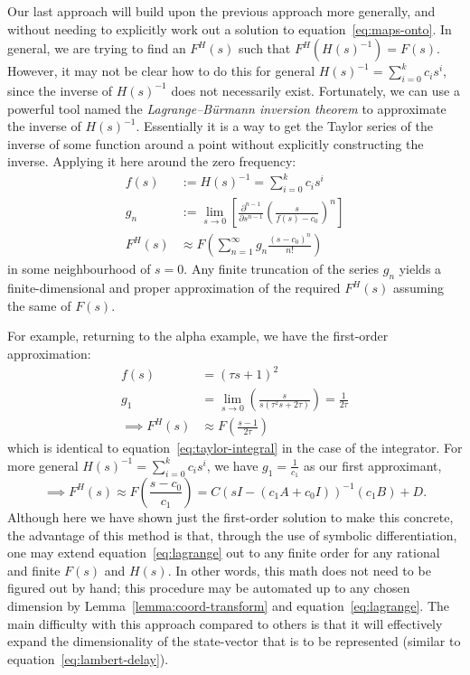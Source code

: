 Our last approach will build upon the previous approach more generally, and without needing to explicitly work out a solution to equation~\ref{eq:maps-onto}.
In general, we are trying to find an $F^H(s)$ such that $F^H(H(s)^{-1}) = F(s)$.
However, it may not be clear how to do this for general $H(s)^{-1} = \sum_{i=0}^k c_i s^i$, since the inverse of $H(s)^{-1}$ does not necessarily exist.
Fortunately, we can use a powerful tool named the {\it Lagrange--B\"urmann inversion theorem} to approximate the inverse of $H(s)^{-1}$.
Essentially it is a way to get the Taylor series of the inverse of some function around a point without explicitly constructing the inverse. Applying it here around the zero frequency:
\begin{align} \label{eq:lagrange}
f(s) &:= H(s)^{-1} = \sum_{i=0}^k c_i s^i \nonumber \\
g_n &:= \lim_{s \rightarrow 0} \left[ \frac{\partial^{n-1}}{\partial s^{n-1}} \left( \frac{s}{f(s) - c_0} \right)^n \right] \nonumber \\
F^H(s) &\approx F \left( \sum_{n=1}^\infty g_n \frac{(s - c_0)^n}{n!} \right)
\end{align}
in some neighbourhood of $s = 0$.
Any finite truncation of the series $g_n$ yields a finite-dimensional and proper approximation of the required $F^H(s)$ assuming the same of $F(s)$.

For example, returning to the alpha example, we have the first-order approximation:
\begin{align*}
f(s) &= (\tau s + 1)^2 \\
g_1 &= \lim_{s \rightarrow 0} \left( \frac{s}{ s(\tau^2 s + 2 \tau)} \right) = \frac{1}{2 \tau} \\
\implies F^H(s) &\approx F \left( \frac{s - 1}{2\tau} \right)
\end{align*}
which is identical to equation~\ref{eq:taylor-integral} in the case of the integrator.
For more general $H(s)^{-1} = \sum_{i=0}^k c_i s^i$, we have $g_1 = \frac{1}{c_1}$ as our first approximant,
\begin{equation}
\implies F^H(s) \approx F \left( \frac{s - c_0}{c_1} \right) = C \left( sI - (c_1 A + c_0 I) \right)^{-1} (c_1 B) + D \text{.}
\end{equation}
Although here we have shown just the first-order solution to make this concrete, the advantage of this method is that, through the use of symbolic differentiation, one may extend equation~\ref{eq:lagrange} out to any finite order for any rational and finite $F(s)$ and $H(s)$.
In other words, this math does not need to be figured out by hand; this procedure may be automated up to any chosen dimension by Lemma~\ref{lemma:coord-transform} and equation~\ref{eq:lagrange}.
The main difficulty with this approach compared to others is that it will effectively expand the dimensionality of the state-vector that is to be represented (similar to equation~\ref{eq:lambert-delay}).


